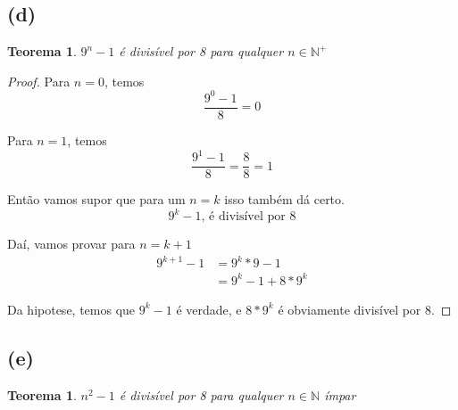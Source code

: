 \documentclass{article}
\begin{document}
\subsection*{(d)}
\newtheorem{teo4}{Teorema}
\begin{teo4}
	$9^n - 1$ é divisível por 8 para qualquer $n \in \mathbb{N^+}$ 
\end{teo4}
\begin{proof}
	Para $n = 0$, temos
	\begin{equation}
		\dfrac{9^0 - 1}{8} = 0
	\end{equation}

	Para $n = 1$, temos
	\begin{equation}
		\dfrac{9^1 - 1}{8} = \dfrac{8}{8} = 1
	\end{equation}

	Então vamos supor que para um $n = k$ isso também dá certo.
	\begin{equation}
		9^k - 1 \text{, é divisível por 8}
	\end{equation}

	Daí, vamos provar para $n = k + 1$
	\begin{equation}
	\begin{split}
		9^{k+1} - 1 & = 9^k * 9 - 1 \\
		& = 9^k - 1 + 8*9^k
	\end{split}
	\end{equation}

	Da hipotese, temos que $9^k - 1$ é verdade, e $8*9^k$ é obviamente
	divisível por 8.
\end{proof}

\subsection*{(e)}
\newtheorem{teo5}{Teorema}
\begin{teo5}
	$n^2 - 1$ é divisível por 8 para qualquer $n \in \mathbb{N}$ ímpar
\end{teo5}
\end{document}
